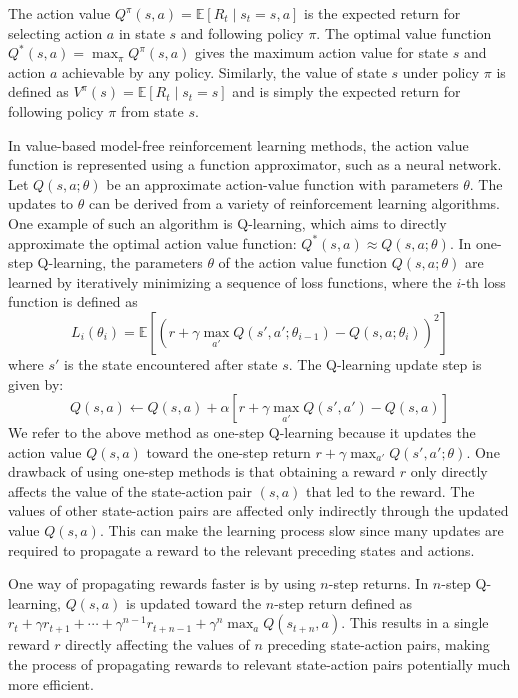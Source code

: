 \documentclass{article}
\begin{document}
The action value \(Q^\pi(s, a) = \mathbb{E}[R_t \mid s_t = s, a]\) is the expected return for selecting action \(a\) in state \(s\) and following policy \(\pi\). The optimal value function \(Q^*(s, a) = \max_\pi Q^\pi(s, a)\) gives the maximum action value for state \(s\) and action \(a\) achievable by any policy. Similarly, the value of state \(s\) under policy \(\pi\) is defined as \(V^\pi(s) = \mathbb{E}[R_t \mid s_t = s]\) and is simply the expected return for following policy \(\pi\) from state \(s\).

In value-based model-free reinforcement learning methods, the action value function is represented using a function approximator, such as a neural network. Let \(Q(s, a; \theta)\) be an approximate action-value function with parameters \(\theta\). The updates to \(\theta\) can be derived from a variety of reinforcement learning algorithms. One example of such an algorithm is Q-learning, which aims to directly approximate the optimal action value function: \(Q^*(s, a) \approx Q(s, a; \theta)\). In one-step Q-learning, the parameters \(\theta\) of the action value function \(Q(s, a; \theta)\) are learned by iteratively minimizing a sequence of loss functions, where the \(i\)-th loss function is defined as
\[
L_i(\theta_i) = \mathbb{E} \left[ \left( r + \gamma \max_{a'} Q(s', a'; \theta_{i-1}) - Q(s, a; \theta_i) \right)^2 \right]
\]
where \(s'\) is the state encountered after state \(s\). The Q-learning update step is given by:
\[
Q(s, a) \leftarrow Q(s, a) + \alpha \left[ r + \gamma \max_{a'} Q(s', a') - Q(s, a) \right]
\]
We refer to the above method as one-step Q-learning because it updates the action value \(Q(s, a)\) toward the one-step return \(r + \gamma \max_{a'} Q(s', a'; \theta)\). One drawback of using one-step methods is that obtaining a reward \(r\) only directly affects the value of the state-action pair \((s, a)\) that led to the reward. The values of other state-action pairs are affected only indirectly through the updated value \(Q(s, a)\). This can make the learning process slow since many updates are required to propagate a reward to the relevant preceding states and actions.

One way of propagating rewards faster is by using \(n\)-step returns. In \(n\)-step Q-learning, \(Q(s, a)\) is updated toward the \(n\)-step return defined as \(r_t + \gamma r_{t+1} + \cdots + \gamma^{n-1} r_{t+n-1} + \gamma^n \max_a Q(s_{t+n}, a)\). This results in a single reward \(r\) directly affecting the values of \(n\) preceding state-action pairs, making the process of propagating rewards to relevant state-action pairs potentially much more efficient.
\end{document}
